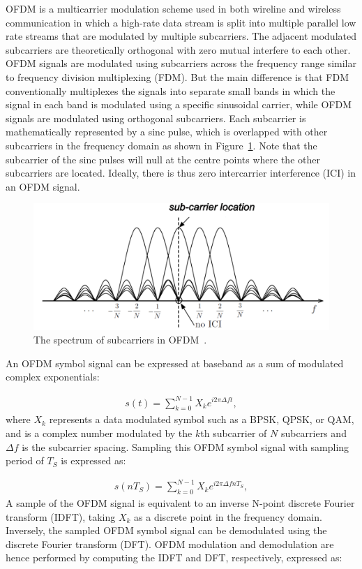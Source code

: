 OFDM is a multicarrier modulation scheme used in both wireline and wireless communication in which a high-rate data stream is split into multiple parallel low rate streams that are modulated by multiple subcarriers.
The adjacent modulated subcarriers are theoretically orthogonal with zero mutual interfere to each other.
OFDM signals are modulated using subcarriers across the frequency range similar to frequency division multiplexing (FDM).
But the main difference is that FDM conventionally multiplexes the signals into separate small bands in which the signal in each band is modulated using a specific sinusoidal carrier, while OFDM signals are modulated using orthogonal subcarriers.
Each subcarrier is mathematically represented by a sinc pulse, which is overlapped with other subcarriers in the frequency domain as shown in Figure~\ref{fig:OFDM-subcarrier}.
Note that the subcarrier of the sinc pulses will null at the centre points where the other subcarriers are located. Ideally, there is thus zero intercarrier interference (ICI) in an OFDM signal.

\begin{figure}
	\centerline{\includegraphics [width=0.8\columnwidth] {Figures/OFDM-subcarrier.pdf} }
	\caption{The spectrum of subcarriers in OFDM~\cite{farhang2008signal}.}
	\label{fig:OFDM-subcarrier}
\end{figure}

An OFDM symbol signal can be expressed at baseband as a sum of modulated complex exponentials:

\begin{eqnarray}
\label{equ:OFDMsignal}
s(t) = \sum_{k=0}^{N-1} X_k e^{i2\pi\Delta ft},
\end{eqnarray}
where $X_{k}$ represents a data modulated symbol such as a BPSK, QPSK, or QAM, and is a complex number modulated by the $k$th subcarrier of $N$ subcarriers and $\Delta f$ is the subcarrier spacing.
Sampling this OFDM symbol signal with sampling period of $T_S$ is expressed as:

\begin{eqnarray}
\label{equ:sampledOFDMsignal}
s(nT_S) = \sum_{k=0}^{N-1} X_k e^{i2\pi\Delta fnT_S},
\end{eqnarray}
A sample of the OFDM signal is equivalent to an inverse N-point discrete Fourier transform (IDFT), taking $X_{k}$ as a discrete point in the frequency domain.
Inversely, the sampled OFDM symbol signal can be demodulated using the discrete Fourier transform (DFT). OFDM modulation and demodulation are hence performed by computing the IDFT and DFT, respectively, expressed as:

